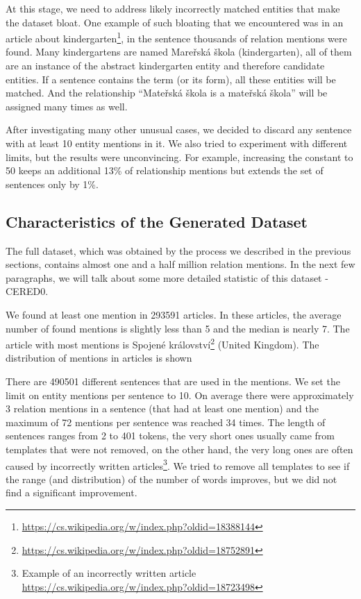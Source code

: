At this stage, we need to address likely incorrectly matched entities that make the dataset bloat. One example of such bloating that we encountered was in an article about kindergarten\footnote{\url{https://cs.wikipedia.org/w/index.php?oldid=18388144}}, in the sentence  thousands of relation mentions were found. Many kindergartens are named Mareřská škola (kindergarten), all of them are an instance of the abstract kindergarten entity and therefore candidate entities. If a sentence contains the term  (or its form), all these entities will be matched. And the relationship “Mateřská škola is a mateřská škola”  will be assigned many times as well. 

After investigating many other unusual cases, we decided to discard any sentence with at least 10 entity mentions in it. We also tried to experiment with different limits, but the results were unconvincing. For example, increasing the constant to 50 keeps an additional 13\% of relationship mentions but extends the set of sentences only by 1\%.


\subsection{Characteristics of the Generated Dataset}
The full dataset, which was obtained by the process we described in the previous sections, contains almost one and a half million relation mentions. In the next few paragraphs, we will talk about some more detailed statistic of this dataset - CERED0. 

We found at least one mention in 293591 articles. In these articles, the average number of found mentions is slightly less than 5 and the median is nearly 7. The article with most mentions is Spojené království\footnote{\url{https://cs.wikipedia.org/w/index.php?oldid=18752891}} (United Kingdom). The distribution of mentions in articles is shown 

There are 490501 different sentences that are used in the mentions. We set the limit on entity mentions per sentence to 10. On average there were approximately 3 relation mentions in a sentence (that had at least one mention) and the maximum of 72 mentions per sentence was reached 34 times. The length of sentences ranges from 2 to 401 tokens, the very short ones usually came from templates that were not removed, on the other hand, the very long ones are often caused by incorrectly written articles\footnote{Example of an incorrectly written article \url{https://cs.wikipedia.org/w/index.php?oldid=18723498}}. We tried to remove all templates to see if the range (and distribution) of the number of words improves, but we did not find a significant improvement.



